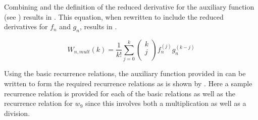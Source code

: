 Combining  and the definition of the reduced derivative for the auxiliary function (see ) results in . This equation, when rewritten to include the reduced derivatives for $f_{n}$ and $g_{n}$, results in .

\begin{equation} \label{eq:LeibnizInt}
W_{n,mult}\left(k\right)=\dfrac{1}{k!}\displaystyle\sum_{j=0}^{k}
\left(
\begin{matrix}
k\\
j\\
\end{matrix}
\right)
f_{n}^{\left( j\right)}g_{n}^{\left( k-j\right)}
\end{equation}

Using the basic recurrence relations, the auxiliary function provided in  can be written to form the required recurrence relations as is shown by . Here a sample recurrence relation is provided for each of the basic relations as well as the recurrence relation for $w_{9}$ since this involves both a multiplication as well as a division.


